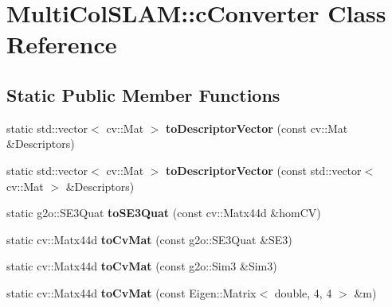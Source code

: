 \hypertarget{classMultiColSLAM_1_1cConverter}{}\section{Multi\+Col\+S\+L\+AM\+:\+:c\+Converter Class Reference}
\label{classMultiColSLAM_1_1cConverter}
\subsection*{Static Public Member Functions}
\begin{DoxyCompactItemize}
\item 
static std\+::vector$<$ cv\+::\+Mat $>$ {\bfseries to\+Descriptor\+Vector} (const cv\+::\+Mat \&Descriptors)\hypertarget{classMultiColSLAM_1_1cConverter_aed35bfe5af479cdf6f51076a75c35cad}{}\label{classMultiColSLAM_1_1cConverter_aed35bfe5af479cdf6f51076a75c35cad}

\item 
static std\+::vector$<$ cv\+::\+Mat $>$ {\bfseries to\+Descriptor\+Vector} (const std\+::vector$<$ cv\+::\+Mat $>$ \&Descriptors)\hypertarget{classMultiColSLAM_1_1cConverter_a7eb4230e5c2f8d90c7f8605ff53dae9f}{}\label{classMultiColSLAM_1_1cConverter_a7eb4230e5c2f8d90c7f8605ff53dae9f}

\item 
static g2o\+::\+S\+E3\+Quat {\bfseries to\+S\+E3\+Quat} (const cv\+::\+Matx44d \&hom\+CV)\hypertarget{classMultiColSLAM_1_1cConverter_a5034944e7a9528d8ae88ccf8b5f06807}{}\label{classMultiColSLAM_1_1cConverter_a5034944e7a9528d8ae88ccf8b5f06807}

\item 
static cv\+::\+Matx44d {\bfseries to\+Cv\+Mat} (const g2o\+::\+S\+E3\+Quat \&S\+E3)\hypertarget{classMultiColSLAM_1_1cConverter_a8275572db49611d569c350bb8c0076fb}{}\label{classMultiColSLAM_1_1cConverter_a8275572db49611d569c350bb8c0076fb}

\item 
static cv\+::\+Matx44d {\bfseries to\+Cv\+Mat} (const g2o\+::\+Sim3 \&Sim3)\hypertarget{classMultiColSLAM_1_1cConverter_adb00accfb0db5901eab1faad46822a10}{}\label{classMultiColSLAM_1_1cConverter_adb00accfb0db5901eab1faad46822a10}

\item 
static cv\+::\+Matx44d {\bfseries to\+Cv\+Mat} (const Eigen\+::\+Matrix$<$ double, 4, 4 $>$ \&m)\hypertarget{classMultiColSLAM_1_1cConverter_af698d2f378ba040226897dfb65bef347}{}\label{classMultiColSLAM_1_1cConverter_af698d2f378ba040226897dfb65bef347}


\end{DoxyCompactItemize}
